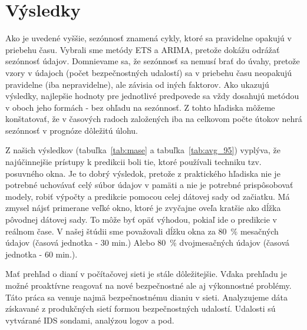\documentclass[thesismargins, thesislinespacing, openright, upjsfrontpage, combineabstracts]{rnthesis}
\begin{document}
\section{Výsledky}

Ako je uvedené vyššie, sezónnosť znamená cykly, ktoré sa pravidelne opakujú v priebehu času. Vybrali sme metódy ETS a ARIMA, pretože dokážu odrážať sezónnosť údajov. Domnievame sa, že sezónnosť sa nemusí brať do úvahy, pretože vzory v údajoch (počet bezpečnostných udalostí) sa v priebehu času neopakujú pravidelne (iba nepravidelne), ale závisia od iných faktorov. Ako ukazujú výsledky, najlepšie hodnoty pre jednotlivé predpovede sa vždy dosahujú metódou v oboch jeho formách - bez ohľadu na sezónnosť. Z tohto hľadiska môžeme konštatovať, že v časových radoch založených iba na celkovom počte útokov nehrá sezónnosť v prognóze dôležitú úlohu.

Z našich výsledkov (tabuľka~\ref{tab:mase} a tabuľka~\ref{tab:avg_95}) vyplýva, že najúčinnejšie prístupy k predikcii boli tie, ktoré používali techniku tzv. posuvného okna. Je to dobrý výsledok, pretože z praktického hľadiska nie je potrebné uchovávať celý súbor údajov v pamäti a nie je potrebné prispôsobovať modely, robiť výpočty a predikcie pomocou celej dátovej sady od začiatku. Má zmysel nájsť primerane veľké okno, ktoré je zvyčajne oveľa kratšie ako dĺžka pôvodnej dátovej sady. To môže byť opäť výhodou, pokiaľ ide o predikcie v reálnom čase. V našej štúdii sme považovali dĺžku okna za 80~\% mesačných údajov (časová jednotka - 30 min.) Alebo 80~\% dvojmesačných údajov (časová jednotka - 60 min.).


\zaver

Mať prehľad o dianí v počítačovej sieti je stále dôležitejšie. Vďaka prehľadu je možné proaktívne reagovať na nové bezpečnostné ale aj výkonnostné problémy. Táto práca sa venuje najmä bezpečnostnému dianiu v sieti. Analyzujeme dáta získavané z produkčných sietí formou bezpečnostných udalostí. Udalosti sú vytvárané IDS sondami, analýzou logov a pod. 
\end{document}
